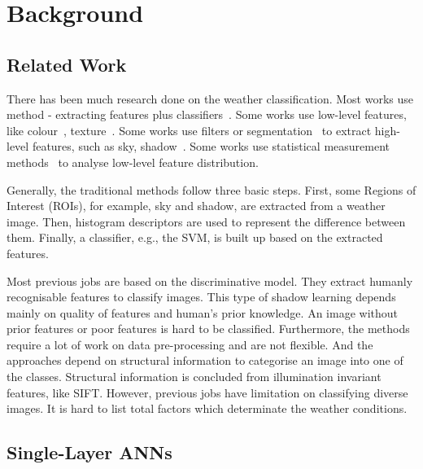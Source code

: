 
\chapter{Background} %
\label{Chapter2}

\section{Related Work}

There has been much research done on the weather classification. Most works use method - extracting features plus classifiers~\citep{bishop1995neural,roser2008classification,serrano2002computationally,gokalp2007scene}.
Some works use low-level features, like colour~\citep{szummer1998indoor}, texture~\citep{shotton2009textonboost,vailaya2002automatic}. Some works use filters or segmentation~\citep{boutell2004learning,shotton2009textonboost} to extract high-level features, such as sky, shadow~\citep{lutwo}. Some works use statistical measurement methods~\citep{he2014spatial,roser2008classification} to analyse low-level feature distribution.

Generally, the traditional methods follow three basic steps\citep{roser2008classification,yan2009weather}. First, some Regions of Interest (ROIs), for example, sky and shadow,  are extracted from a weather image. Then, histogram descriptors are used to represent the difference between them. Finally, a classifier, e.g., the SVM, is built up based on the extracted features. 

Most previous jobs are based on the discriminative model. They extract humanly recognisable features to classify images. This type of shadow learning depends mainly on quality of features and human's prior knowledge. An image without prior features or poor features is hard to be classified. Furthermore, the methods require a lot of work on data pre-processing and are not flexible. And the approaches depend on structural information to categorise an image into one of the classes. Structural information is concluded from illumination invariant features, like SIFT. However, previous jobs have limitation on classifying diverse images. It is hard to list total factors which determinate the weather conditions.

\section{Single-Layer ANNs}


